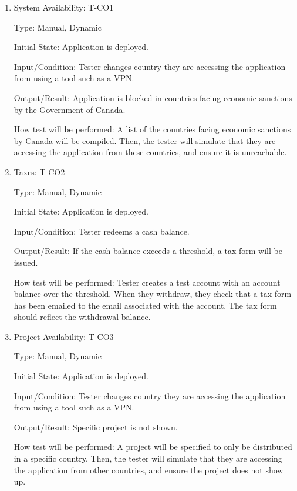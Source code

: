 \documentclass[12pt, titlepage]{article}
\begin{document}
\begin{enumerate}

\item{System Availability: T-CO1\\}

Type: Manual, Dynamic
					
Initial State: Application is deployed.
					
Input/Condition: Tester changes country they are accessing the application from using a tool such as a VPN.
					
Output/Result: Application is blocked in countries facing economic sanctions by the Government of Canada.
					
How test will be performed: A list of the countries facing economic sanctions by Canada will be compiled. Then, the tester will simulate that they are accessing the application from these countries, and ensure it is unreachable.

\item{Taxes: T-CO2\\}

Type: Manual, Dynamic
					
Initial State: Application is deployed.
					
Input/Condition: Tester redeems a cash balance.
					
Output/Result: If the cash balance exceeds a threshold, a tax form will be issued.
					
How test will be performed: Tester creates a test account with an account balance over the threshold. When they withdraw, they check that a tax form has been emailed to the email associated with the account. The tax form should reflect the withdrawal balance.

\item{Project Availability: T-CO3\\}

Type: Manual, Dynamic
					
Initial State: Application is deployed.
					
Input/Condition: Tester changes country they are accessing the application from using a tool such as a VPN.
					
Output/Result: Specific project is not shown.
					
How test will be performed: A project will be specified to only be distributed in a specific country. Then, the tester will simulate that they are accessing the application from other countries, and ensure the project does not show up.

\end{enumerate}
\end{document}
